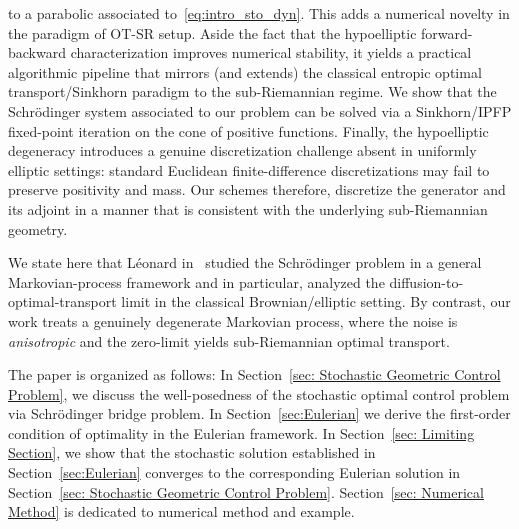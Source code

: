 \documentclass{amsart}
\numberwithin{equation}{section}
\begin{document}
to a parabolic  associated to~\eqref{eq:intro_sto_dyn}. This adds a numerical novelty in the paradigm of OT-SR setup. Aside the fact that the hypoelliptic forward-backward characterization improves 
numerical stability, it yields a practical algorithmic pipeline that mirrors (and extends) the classical entropic optimal transport/Sinkhorn 
paradigm to the sub-Riemannian regime. We show that the Schr\"odinger system associated to our problem can be solved via a Sinkhorn/IPFP 
fixed-point iteration on the cone of positive functions. Finally, the hypoelliptic degeneracy introduces a genuine 
discretization challenge absent in uniformly elliptic settings: standard Euclidean 
finite-difference discretizations may fail to preserve positivity and mass. Our 
schemes therefore, discretize the generator and its adjoint in a manner that is consistent 
with the underlying sub-Riemannian geometry. 


We state here that L\'eonard in~\cite{Leonard2012} studied the Schr\"odinger problem in a general Markovian-process framework and in particular, analyzed the diffusion-to-optimal-transport limit in the classical Brownian/elliptic setting. By contrast, our work treats a genuinely degenerate Markovian process, where the noise is \emph{anisotropic} and the zero-limit yields sub-Riemannian optimal transport.

The paper is organized as follows: In Section~\ref{sec: Stochastic Geometric Control Problem}, we discuss the well-posedness of the stochastic optimal control problem via Schr\"odinger bridge problem. In Section~\ref{sec:Eulerian} we derive the first-order condition of optimality in the Eulerian framework. In Section~\ref{sec: Limiting Section}, we show that the stochastic solution established in Section~\ref{sec:Eulerian} converges to the corresponding Eulerian solution in Section~\ref{sec: Stochastic Geometric Control Problem}. Section~\ref{sec: Numerical Method} is dedicated to numerical method and example.
\end{document}
